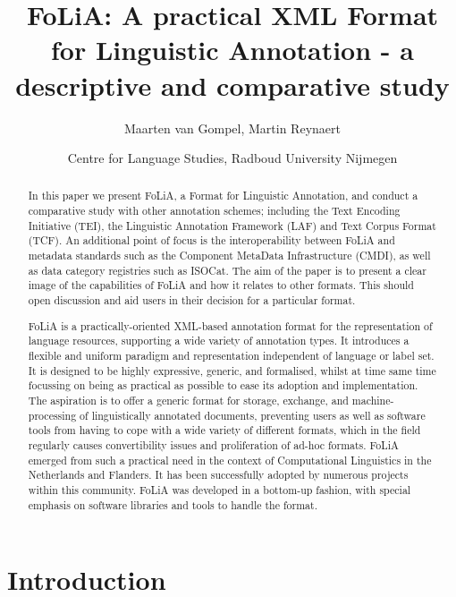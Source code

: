 \documentclass[a4paper,10pt,twoside]{article}
\title{FoLiA: A practical XML Format for Linguistic Annotation - a descriptive and comparative study}
\author{Maarten van Gompel, Martin Reynaert}
\date{Centre for Language Studies, Radboud University Nijmegen}
\begin{document}
\maketitle

\begin{abstract}

In this paper we present FoLiA, a Format for Linguistic Annotation, and conduct
a comparative study with other annotation schemes; including the
Text Encoding Initiative (TEI), the Linguistic Annotation Framework
(LAF) and Text Corpus Format (TCF). An additional point of focus is the
interoperability between FoLiA and metadata standards such as the Component
MetaData Infrastructure (CMDI), as well as data category registries such as
ISOCat. The aim of the paper is to present a clear image of the capabilities of
FoLiA and how it relates to other formats. This should open discussion and aid
users in their decision for a particular format.

FoLiA is a practically-oriented XML-based annotation format for the
representation of language resources, supporting a wide variety of annotation
types. It introduces a flexible and uniform paradigm and representation
independent of language or label set. It is designed to be highly
expressive, generic, and formalised, whilst at time same time focussing on
being as practical as possible to ease its adoption and implementation. The aspiration is to offer a generic format for storage, exchange, and
machine-processing of linguistically annotated documents, preventing users as
well as software tools from having to cope with a wide variety of different
formats, which in the field regularly causes convertibility issues and
proliferation of ad-hoc formats. FoLiA emerged from such a practical need in
the context of Computational Linguistics in the Netherlands and Flanders. It
has been successfully adopted by numerous projects within this community. FoLiA
was developed in a bottom-up fashion, with special emphasis on software
libraries and tools to handle the format.

\end{abstract}

\section{Introduction}
\end{document}
